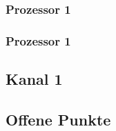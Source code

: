 \subsubsection{Prozessor 1}

\subsubsection{Prozessor 1}

\subsection{Kanal 1}

\subsection{Offene Punkte}
